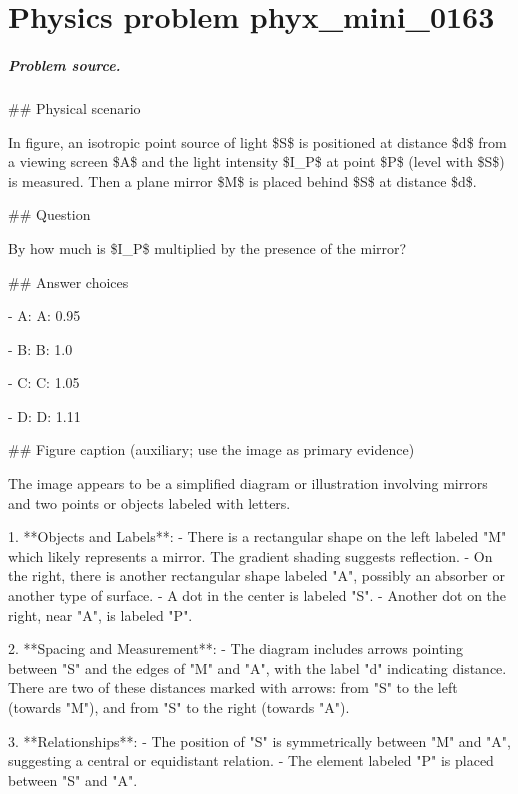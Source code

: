 
\chapter{Physics problem phyx\_mini\_0163}
\label{ch:PhyXMiniProblems_problem_phyx_mini_0163}

\paragraph{Problem source.}
\#\# Physical scenario

In figure, an isotropic point source of light \$S\$ is positioned at distance \$d\$ from a viewing screen \$A\$ and the light intensity \$I\_P\$ at point \$P\$ (level with \$S\$) is measured. Then a plane mirror \$M\$ is placed behind \$S\$ at distance \$d\$.

\#\# Question

By how much is \$I\_P\$ multiplied by the presence of the mirror?

\#\# Answer choices

- A: A: 0.95

- B: B: 1.0

- C: C: 1.05

- D: D: 1.11

\#\# Figure caption (auxiliary; use the image as primary evidence)

The image appears to be a simplified diagram or illustration involving mirrors and two points or objects labeled with letters. 

1. **Objects and Labels**:
   - There is a rectangular shape on the left labeled "M" which likely represents a mirror. The gradient shading suggests reflection.
   - On the right, there is another rectangular shape labeled "A", possibly an absorber or another type of surface.
   - A dot in the center is labeled "S".
   - Another dot on the right, near "A", is labeled "P".

2. **Spacing and Measurement**:
   - The diagram includes arrows pointing between "S" and the edges of "M" and "A", with the label "d" indicating distance. There are two of these distances marked with arrows: from "S" to the left (towards "M"), and from "S" to the right (towards "A").
  
3. **Relationships**:
   - The position of "S" is symmetrically between "M" and "A", suggesting a central or equidistant relation.
   - The element labeled "P" is placed between "S" and "A".

